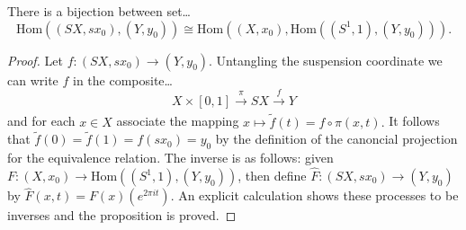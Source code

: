 \begin{proposition}
There is a bijection between set\dots
$$\textrm{Hom}((SX,sx_0),(Y,y_0)) \cong \textrm{Hom}((X,x_0),\textrm{Hom}((S^1,1),(Y,y_0))).$$
\end{proposition}

\begin{proof}
Let $f : (SX, sx_0) \rightarrow (Y,y_0)$. Untangling the suspension coordinate we can write $f$ in the composite\dots
$$X \times [0,1] \xrightarrow[]{\pi} SX \xrightarrow[]{f} Y$$
and for each $x \in X$ associate the mapping $x \mapsto \tilde f (t) = f \circ \pi (x,t).$ It follows that $\tilde f (0) = \tilde f (1) = f(sx_0) = y_0$
by the definition of the canoncial projection for the equivalence relation. The inverse is as follows: given $F : (X,x_0) \rightarrow \textrm{Hom}((S^1,1),(Y,y_0))$,
then define $\hat{F} : (SX, sx_0) \rightarrow (Y, y_0)$ by $\hat{F}(x,t) = F(x)(e^{2 \pi i t})$. An explicit calculation shows these processes to be inverses and the
proposition is proved.
\end{proof}